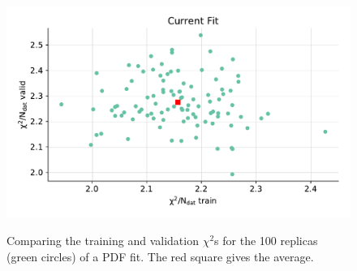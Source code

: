 \begin{figure}[H]
\centering
\includegraphics[width=\textwidth]{background/trvalchi2.pdf}
\label{fig:crossvalidation}
\caption{Comparing the training and validation $\chi^2$s for the 100 replicas (green circles) of a PDF fit. The red square gives the average.}
\end{figure}
